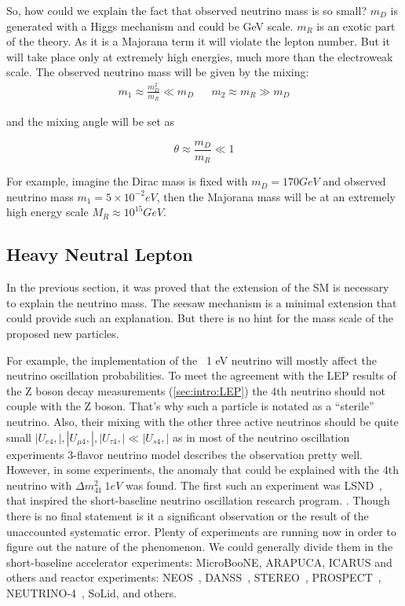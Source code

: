 \documentclass[../main.tex]{subfiles}
\begin{document}
So, how could we explain the fact that observed neutrino mass is so small? $m_D$ is generated with a Higgs mechanism and could be GeV scale. $m_R$ is an exotic part of the theory. As it is a Majorana term it will violate the lepton number. But it will take place only at extremely high energies, much more than the electroweak scale. The observed neutrino mass will be given by the mixing:
\begin{align}
m_1\approx\frac{m_D^2}{m_R} \ll m_D && m_2\approx m_R \gg m_D
\end{align}

and the mixing angle will be set as

\begin{equation}
\theta\approx\frac{m_D}{m_R} \ll 1
\end{equation}

For example, imagine the Dirac mass is fixed with $m_D=170 GeV$ and observed neutrino mass $m_1=5\times 10^{-2} eV$, then the Majorana mass will be at an extremely high energy scale $M_R\approx10^{15}GeV$.

\subsection{Heavy Neutral Lepton}
\label{sec:intro:HNL}
In the previous section, it was proved that the extension of the SM is necessary to explain the neutrino mass. The seesaw mechanism is a minimal extension that could provide such an explanation. But there is no hint for the mass scale of the proposed new particles.

For example, the implementation of the ~1 eV neutrino will mostly affect the neutrino oscillation probabilities. To meet the agreement with the LEP results of the Z boson decay measurements (\autoref{sec:intro:LEP}) the 4th neutrino should not couple with the Z boson. That's why such a particle is notated as a ``sterile'' neutrino. Also, their mixing with the other three active neutrinos should be quite small $\left|U_{e4},\right|, \left|U_{\mu4},\right|, \left|U_{\tau4},\right| \ll \left|U_{s4},\right|$ as in most of the neutrino oscillation experiments 3-flavor neutrino model describes the observation pretty well. However, in some experiments, the anomaly that could be explained with the 4th neutrino with $\Delta m_{41}^2~1eV$ was found. The first such an experiment was LSND~\cite{Athanassopoulos1997}, that inspired the short-baseline neutrino oscillation research program. . Though there is no final statement is it a significant observation or the result of the unaccounted systematic error. Plenty of experiments are running now in order to figure out the nature of the phenomenon. We could generally divide them in the short-baseline accelerator experiments: MicroBooNE, ARAPUCA, ICARUS and others and reactor experiments: NEOS~\cite{Ko2017}, DANSS~\cite{Alekseev2018}, STEREO~\cite{Almazan2018}, PROSPECT~\cite{Ashenfelter2018}, NEUTRINO-4~\cite{Serebrov2015}, SoLid, and others.
\end{document}
